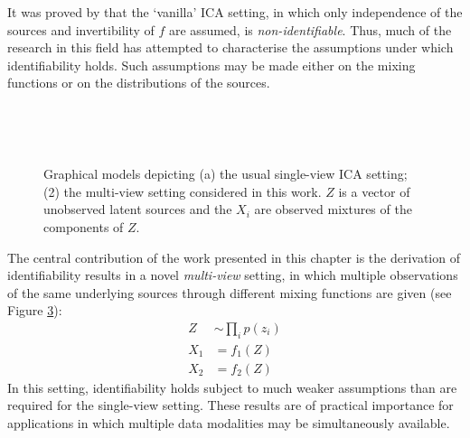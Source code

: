 It was proved by \cite{hyvarinen1999nonlinear} that the `vanilla' ICA setting, in which only independence of the sources and invertibility of $f$ are assumed, is \emph{non-identifiable}.
Thus, much of the research in this field has attempted to characterise the assumptions under which identifiability holds.
Such assumptions may be made either on the mixing functions or on the distributions of the sources. 


\begin{figure}
\center

\end{figure}

\begin{figure}
	\begin{subfigure}{.45\linewidth}
		\center\
		\caption{}\label{fig:ica-model:a}
	\end{subfigure}
	\hfill
	\begin{subfigure}{.45\linewidth}
		\center\
		\caption{}\label{fig:ica-model:b}
	\end{subfigure}
	\caption[Graphical model depictions of ICA and multi-view ICA]{Graphical models depicting (a) the usual single-view ICA setting; (2) the multi-view setting considered in this work. $Z$ is a vector of unobserved latent sources and the $X_i$ are observed mixtures of the components of $Z$.}
\end{figure}


The central contribution of the work presented in this chapter is the derivation of identifiability results in a novel \emph{multi-view} setting, in which multiple observations of the same underlying sources through different mixing functions are given (see Figure \ref{fig:ica-model:b}):
%
\begin{align*}
Z &\sim \prod_i p(z_i) \\
X_1 &= f_1(Z) \\
X_2 &= f_2(Z)
\end{align*}
%
In this setting, identifiability holds subject to much weaker assumptions than are required for the single-view setting.
These results are of practical importance for applications in which multiple data modalities may be simultaneously available.

